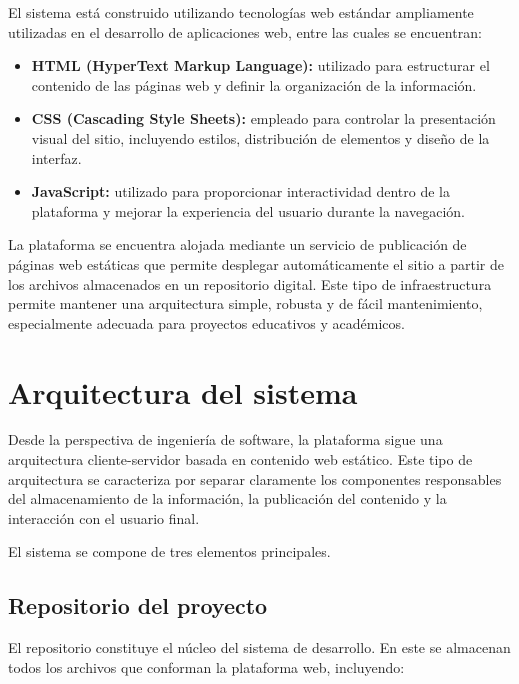 \documentclass[12pt,letterpaper]{article}
\begin{document}
El sistema está construido utilizando tecnologías web estándar ampliamente utilizadas en el desarrollo de aplicaciones web, entre las cuales se encuentran:

\begin{itemize}

\item \textbf{HTML (HyperText Markup Language):} utilizado para estructurar el contenido de las páginas web y definir la organización de la información.

\item \textbf{CSS (Cascading Style Sheets):} empleado para controlar la presentación visual del sitio, incluyendo estilos, distribución de elementos y diseño de la interfaz.

\item \textbf{JavaScript:} utilizado para proporcionar interactividad dentro de la plataforma y mejorar la experiencia del usuario durante la navegación.

\end{itemize}

La plataforma se encuentra alojada mediante un servicio de publicación de páginas web estáticas que permite desplegar automáticamente el sitio a partir de los archivos almacenados en un repositorio digital. Este tipo de infraestructura permite mantener una arquitectura simple, robusta y de fácil mantenimiento, especialmente adecuada para proyectos educativos y académicos.


\section{Arquitectura del sistema}

Desde la perspectiva de ingeniería de software, la plataforma sigue una arquitectura cliente-servidor basada en contenido web estático. Este tipo de arquitectura se caracteriza por separar claramente los componentes responsables del almacenamiento de la información, la publicación del contenido y la interacción con el usuario final.

El sistema se compone de tres elementos principales.

\subsection{Repositorio del proyecto}

El repositorio constituye el núcleo del sistema de desarrollo. En este se almacenan todos los archivos que conforman la plataforma web, incluyendo:
\end{document}
